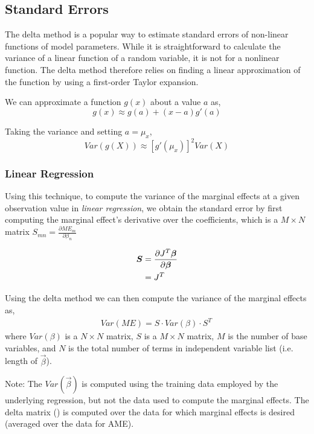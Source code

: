 \subsection{Standard Errors} %
\label{sub:standard_errors}
The delta method is a popular way to estimate standard errors of non-linear
functions of model parameters. While it is straightforward to calculate the
variance of a linear function of a random variable, it is not for a nonlinear
function. The delta method therefore relies on finding a linear approximation
of the function by using a first-order Taylor expansion.

We can approximate a function $g(x)$ about a value $a$ as,
\[ g(x) \approx g(a) + (x-a)g'(a) \]

Taking the variance and setting $a = \mu_x$,
\[ Var(g(X)) \approx \left[g'(\mu_x)\right]^2 Var(X) \]

\subsubsection*{Linear Regression} %
\label{ssub:linear_regression}
Using this technique, to compute the variance of the marginal effects
at a given observation value in \emph{linear regression}, we obtain
the standard error by first computing the marginal effect's derivative
over the coefficients, which is a $M\times N$ matrix $S_{mn}
= \frac{\partial \mathit{ME}_m}{\partial \beta_n}$

\begin{align*}
    \vec{S} &= \pder[J^T \vec{\beta}]{\vec{\beta}} \\
            &= J^T
\end{align*}

Using the delta method we can then compute the variance of the marginal effects
as,
\begin{align*}
  Var(\mathit{ME}) = S \cdot Var(\beta)\cdot S^T\,
\end{align*}
where $Var(\beta)$ is a $N\times N$ matrix, $S$ is a $M\times N$
matrix, $M$ is the number of base variables, and $N$ is the total number of
terms in independent variable list (i.e. length of $\vec{\beta}$).

Note: The $Var(\vec{\beta})$ is computed using the training data
employed by the underlying regression, but not the data used to compute the
marginal effects. The delta matrix () is computed over the
data for which marginal effects is desired (averaged over the data for AME).

